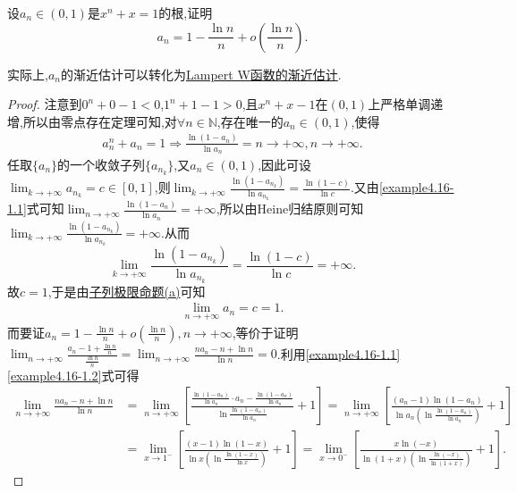 \documentclass[../../main.tex]{subfiles}%
\begin{document}
\begin{example}
设\(a_n\in(0,1)\)是\(x^n + x = 1\)的根,证明
\[
a_n=1-\frac{\ln n}{n}+o\left(\frac{\ln n}{n}\right).
\]
\end{example}
\begin{note}
实际上,$a_n$的渐近估计可以转化为\hyperref[proposition:Lampert W 函数的渐近估计]{Lampert W函数的渐近估计}.
\end{note}
\begin{proof}
注意到\(0^n + 0 - 1 < 0\),\(1^n + 1 - 1 > 0\),且\(x^n + x - 1\)在\((0, 1)\)上严格单调递增,所以由零点存在定理可知,对\(\forall n\in \mathbb{N}\),存在唯一的\(a_n\in (0, 1)\),使得
\begin{align}\label{example4.16-1.1}
a_{n}^{n} + a_n = 1 \Rightarrow \frac{\ln(1 - a_n)}{\ln a_n} = n \rightarrow +\infty, n \rightarrow +\infty.  
\end{align}
任取\(\{ a_n \}\)的一个收敛子列\(\{ a_{n_k} \}\),又\(a_n\in (0, 1)\),因此可设\(\lim_{k\rightarrow +\infty}a_{n_k} = c\in [0, 1]\),则\(\lim_{k\rightarrow +\infty}\frac{\ln(1 - a_{n_k})}{\ln a_{n_k}} = \frac{\ln(1 - c)}{\ln c}\).又由\eqref{example4.16-1.1}式可知\(\lim_{n\rightarrow +\infty}\frac{\ln(1 - a_n)}{\ln a_n} = +\infty\),所以由Heine归结原则可知\(\lim_{k\rightarrow +\infty}\frac{\ln(1 - a_{n_k})}{\ln a_{n_k}} = +\infty\).从而
\[
\lim_{k\rightarrow +\infty}\frac{\ln(1 - a_{n_k})}{\ln a_{n_k}} = \frac{\ln(1 - c)}{\ln c} = +\infty.
\]
故\(c = 1\),于是由\hyperref[proposition:子列极限命题]{子列极限命题(a)}可知
\begin{align}\label{example4.16-1.2}
\lim_{n\rightarrow +\infty}a_n = c = 1.  
\end{align}
而要证\(a_n = 1 - \frac{\ln n}{n} + o\left(\frac{\ln n}{n}\right), n \rightarrow +\infty\),等价于证明\(\lim_{n\rightarrow +\infty}\frac{a_n - 1 + \frac{\ln n}{n}}{\frac{\ln n}{n}} = \lim_{n\rightarrow +\infty}\frac{na_n - n + \ln n}{\ln n} = 0\).利用\eqref{example4.16-1.1}\eqref{example4.16-1.2}式可得
\begin{align}
\underset{n\rightarrow +\infty}{\lim}\frac{na_n-n+\ln n}{\ln n}&=\underset{n\rightarrow +\infty}{\lim}\left[ \frac{\frac{\ln \left( 1-a_n \right)}{\ln a_n}\cdot a_n-\frac{\ln \left( 1-a_n \right)}{\ln a_n}}{\ln \frac{\ln \left( 1-a_n \right)}{\ln a_n}}+1 \right] =\underset{n\rightarrow +\infty}{\lim}\left[ \frac{\left( a_n-1 \right) \ln \left( 1-a_n \right)}{\ln a_n\left( \ln \frac{\ln \left( 1-a_n \right)}{\ln a_n} \right)}+1 \right] \nonumber
\\
&=\underset{x\rightarrow 1^-}{\lim}\left[ \frac{\left( x-1 \right) \ln \left( 1-x \right)}{\ln x\left( \ln \frac{\ln \left( 1-x \right)}{\ln x} \right)}+1 \right] =\underset{x\rightarrow 0^-}{\lim}\left[ \frac{x\ln \left( -x \right)}{\ln \left( 1+x \right) \left( \ln \frac{\ln \left( -x \right)}{\ln \left( 1+x \right)} \right)}+1 \right] .

\end{align}
\end{proof}
\end{document}
